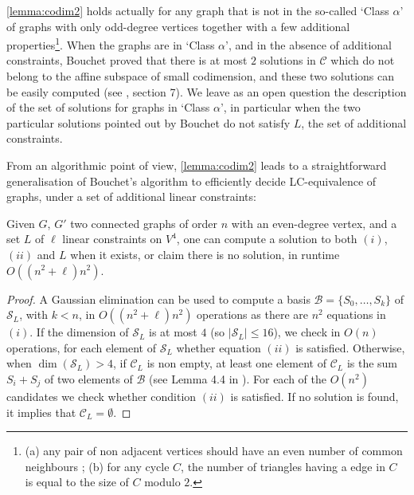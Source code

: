 \documentclass[a4paper,UKenglish,cleveref,autoref,thm-restate]{arxiv}
\begin{document}
\begin{remark} \cref{lemma:codim2} holds actually for any graph that is not in the so-called `Class $\alpha$' of graphs with only odd-degree vertices together with a few additional properties\footnote{(a) any pair of non adjacent vertices should have an even number of common neighbours ; (b) for any cycle $C$, the number of triangles having a edge in $C$ is equal to the size of $C$ modulo $2$.}.  When the graphs are in  `Class $\alpha$', and in the absence of additional constraints, Bouchet proved that there is at most $2$ solutions in $\mathcal C$ which do not belong to the affine subspace of small codimension, and these two solutions can be easily computed (see \cite{Bouchet1991}, section 7).  We leave as an open question the description of the set of solutions for graphs in `Class $\alpha$', in particular when the two particular solutions pointed out by Bouchet do not satisfy $L$, the set of additional constraints. 
\end{remark}
From an algorithmic point of view, \cref{lemma:codim2} leads to a straightforward generalisation of Bouchet's algorithm to  efficiently decide LC-equivalence of graphs, under a set of additional linear constraints: 

\begin{proposition}\label{prop:extendedBouchet}
Given $G$, $G'$ two connected graphs of order $n$ with an even-degree vertex, and a set $L$ of $\ell$ linear constraints on $V^4$, one can compute a solution to both $(i)$, $(ii)$ and $L$ when it exists, or claim there is no solution, in runtime $O((n^2+\ell)n^2)$.
\end{proposition}

\begin{proof} 
A Gaussian elimination can be used to compute a basis $\mathcal B = \{S_0, \ldots , S_k\}$ of $\mathcal S_L$, with $k<n$, in $O((n^2+\ell)n^2)$ operations as there are $n^2$ equations in $(i)$. If the dimension of $\mathcal S_L$ is at most $4$ (so $|\mathcal S_L|\le 16$), we check in $O(n)$ operations, for each element of $\mathcal S_L$ whether equation $(ii)$ is satisfied. Otherwise, when $\dim(\mathcal S_L)>4$, if $\mathcal C_L$ is non empty, at least one element of $\mathcal C_L$ is the sum $S_i +  S_j$ of two  elements of $\mathcal B$ (see Lemma 4.4 in \cite{Bouchet1991}). For each of the $O(n^2)$ candidates we check  whether condition $(ii)$ is satisfied.  If no solution is found, it implies that $\mathcal C_L=\emptyset$. 
\end{proof}
\end{document}
